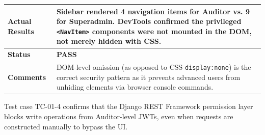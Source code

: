 \begin{table}[H]
{\begin{tabular}{|>{\raggedright\arraybackslash\bfseries}p{4.5cm}|>{\raggedright\arraybackslash}p{11.5cm}|}
        Actual Results & Sidebar rendered 4 navigation items for Auditor vs. 9 for Superadmin. DevTools confirmed the privileged \texttt{<NavItem>} components were not mounted in the DOM, not merely hidden with CSS. \\ \hline
        Status & \textcolor{green!60!black}{\textbf{PASS}} \\ \hline
        Comments & DOM-level omission (as opposed to CSS \texttt{display:none}) is the correct security pattern as it prevents advanced users from unhiding elements via browser console commands. \\ \hline
    \end{tabular}
    }
\end{table}

Test case TC-01-4 confirms that the Django REST Framework permission layer blocks write operations from Auditor-level JWTs, even when requests are constructed manually to bypass the UI.

